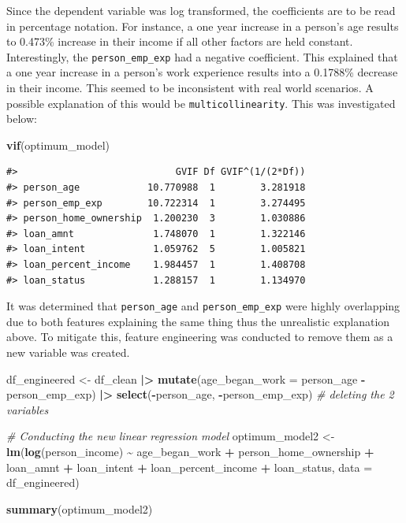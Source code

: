 \documentclass[
  10pt,
]{article}
\newenvironment{Shaded}{\begin{snugshade}}{\end{snugshade}}
\newcommand{\AttributeTok}[1]{\textcolor[rgb]{0.13,0.29,0.53}{#1}}
\newcommand{\CommentTok}[1]{\textcolor[rgb]{0.56,0.35,0.01}{\textit{#1}}}
\newcommand{\FunctionTok}[1]{\textcolor[rgb]{0.13,0.29,0.53}{\textbf{#1}}}
\newcommand{\NormalTok}[1]{#1}
\newcommand{\OtherTok}[1]{\textcolor[rgb]{0.56,0.35,0.01}{#1}}
\newcommand{\SpecialCharTok}[1]{\textcolor[rgb]{0.81,0.36,0.00}{\textbf{#1}}}
\begin{document}
Since the dependent variable was log transformed, the coefficients are
to be read in percentage notation. For instance, a one year increase in
a person's age results to 0.473\% increase in their income if all other
factors are held constant. Interestingly, the \texttt{person\_emp\_exp}
had a negative coefficient. This explained that a one year increase in a
person's work experience results into a 0.1788\% decrease in their
income. This seemed to be inconsistent with real world scenarios. A
possible explanation of this would be \texttt{multicollinearity}. This
was investigated below:\\

\begin{Shaded}
\begin{Highlighting}[]
\FunctionTok{vif}\NormalTok{(optimum\_model)}
\end{Highlighting}
\end{Shaded}

\begin{verbatim}
#>                            GVIF Df GVIF^(1/(2*Df))
#> person_age            10.770988  1        3.281918
#> person_emp_exp        10.722314  1        3.274495
#> person_home_ownership  1.200230  3        1.030886
#> loan_amnt              1.748070  1        1.322146
#> loan_intent            1.059762  5        1.005821
#> loan_percent_income    1.984457  1        1.408708
#> loan_status            1.288157  1        1.134970
\end{verbatim}

It was determined that \texttt{person\_age} and
\texttt{person\_emp\_exp} were highly overlapping due to both features
explaining the same thing thus the unrealistic explanation above. To
mitigate this, feature engineering was conducted to remove them as a new
variable was created.\\

\begin{Shaded}
\begin{Highlighting}[]
\NormalTok{df\_engineered }\OtherTok{\textless{}{-}}\NormalTok{ df\_clean }\SpecialCharTok{|\textgreater{}}
    \FunctionTok{mutate}\NormalTok{(}\AttributeTok{age\_began\_work =}\NormalTok{ person\_age }\SpecialCharTok{{-}}\NormalTok{ person\_emp\_exp) }\SpecialCharTok{|\textgreater{}}
    \FunctionTok{select}\NormalTok{(}\SpecialCharTok{{-}}\NormalTok{person\_age, }\SpecialCharTok{{-}}\NormalTok{person\_emp\_exp)  }\CommentTok{\# deleting the 2 variables}

\CommentTok{\# Conducting the new linear regression model}
\NormalTok{optimum\_model2 }\OtherTok{\textless{}{-}} \FunctionTok{lm}\NormalTok{(}\FunctionTok{log}\NormalTok{(person\_income) }\SpecialCharTok{\textasciitilde{}}\NormalTok{ age\_began\_work }\SpecialCharTok{+}\NormalTok{ person\_home\_ownership }\SpecialCharTok{+}
\NormalTok{    loan\_amnt }\SpecialCharTok{+}\NormalTok{ loan\_intent }\SpecialCharTok{+}\NormalTok{ loan\_percent\_income }\SpecialCharTok{+}\NormalTok{ loan\_status,}
    \AttributeTok{data =}\NormalTok{ df\_engineered)}

\FunctionTok{summary}\NormalTok{(optimum\_model2)}
\end{Highlighting}
\end{Shaded}
\end{document}
